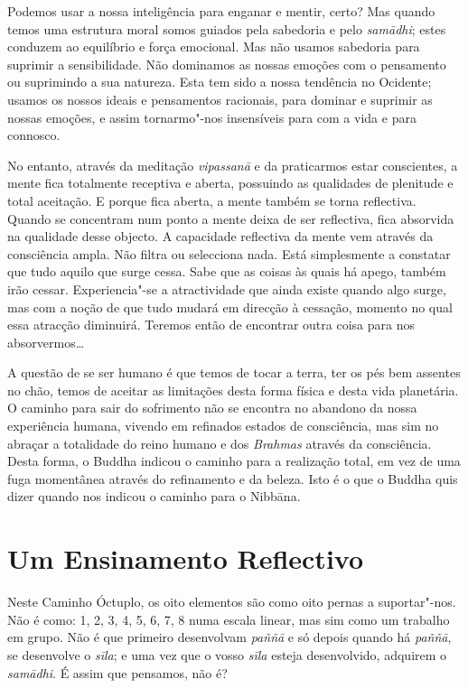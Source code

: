 Podemos usar a nossa inteligência para enganar e mentir, certo? Mas quando temos
uma estrutura moral somos guiados pela sabedoria e pelo \emph{samādhi}; estes
conduzem ao equilíbrio e força emocional. Mas não usamos sabedoria para suprimir
a sensibilidade. Não dominamos as nossas emoções com o pensamento ou suprimindo
a sua natureza. Esta tem sido a nossa tendência no Ocidente; usamos os nossos
ideais e pensamentos racionais, para dominar e suprimir as nossas emoções, e
assim tornarmo"-nos insensíveis para com a vida e para connosco.

No entanto, através da meditação \emph{vipassanā} e da praticarmos estar conscientes,
a mente fica totalmente receptiva e aberta, possuindo as qualidades de plenitude
e total aceitação. E porque fica aberta, a mente também se torna reflectiva.
Quando se concentram num ponto a mente deixa de ser reflectiva, fica absorvida
na qualidade desse objecto. A capacidade reflectiva da mente vem através da
consciência ampla. Não filtra ou selecciona nada. Está simplesmente a constatar que
tudo aquilo que surge cessa. Sabe que as coisas às quais há apego, também irão cessar. Experiencia"-se a atractividade que ainda existe quando algo surge, mas com a noção de que tudo mudará em direcção à cessação, momento no qual essa atracção diminuirá. Teremos então
de encontrar outra coisa para nos absorvermos\ldots{}

A questão de se ser humano é que temos de tocar a terra, ter os pés bem assentes
no chão, temos de aceitar as limitações desta forma física e desta vida
planetária. O caminho para sair do sofrimento não se encontra no abandono da
nossa experiência humana, vivendo em refinados estados de consciência, mas sim no
abraçar a totalidade do reino humano e dos \emph{Brahmas} através da consciência. Desta forma, o Buddha indicou o caminho para a realização total, em vez
de uma fuga momentânea através do refinamento e da beleza. Isto é o que o Buddha
quis dizer quando nos indicou o caminho para o Nibbāna.

\section{Um Ensinamento Reflectivo}

Neste Caminho Óctuplo, os oito elementos são como oito pernas a suportar"-nos.
Não é como: 1, 2, 3, 4, 5, 6, 7, 8 numa escala linear, mas sim como um trabalho
em grupo. Não é que primeiro desenvolvam \emph{paññā} e só depois quando há
\emph{paññā}, se desenvolve o \emph{sīla}; e uma vez que o vosso \emph{sīla}
esteja desenvolvido, adquirem o \emph{samādhi}. É assim que pensamos, não é?

